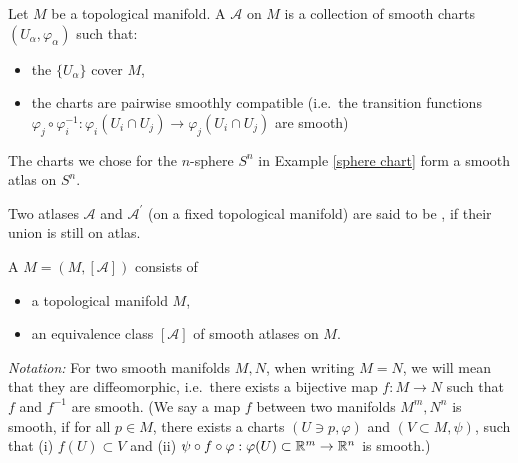 \documentclass[a4paper,11pt]{article}
\begin{document}

\begin{definition}
    Let \(M\) be a topological manifold. A  \(\mathcal{A}\) on \(M\) is a collection of smooth charts \((U_\alpha,\varphi_\alpha)\) such that:
    \begin{itemize}
        \item the \(\{U_\alpha\}\) cover \(M\),
        \item the charts are pairwise smoothly compatible (i.e.\ the transition functions \(\varphi_j \circ \varphi_i^{-1}:\varphi_i(U_i\cap U_j)\to\varphi_j(U_i\cap U_j)\) are smooth)
    \end{itemize}
\end{definition}

\begin{example}
    The charts we chose for the \(n\)-sphere \(S^n\) in Example \ref{sphere chart} form a smooth atlas on \(S^n\).
\end{example}

\begin{definition}
    Two atlases \(\mathcal{A}\) and \(\mathcal{A}^\prime\) (on a fixed topological manifold) are said to be , if their union is still on atlas.
\end{definition}


\begin{definition}
    A  \(M=(M,[\mathcal{A}])\) consists of
    \begin{itemize}
        \item a topological manifold \(M\),
        \item an equivalence class \([\mathcal{A}]\) of smooth atlases on \(M\).
    \end{itemize}
\end{definition}

\noindent\textit{Notation:}
    For two smooth manifolds \(M,N\), when writing \(M=N\), we will mean that they are diffeomorphic, i.e.\ there exists a bijective map \(f:M\to N\) such that \(f\) and \(f^{-1}\) are smooth. 
    (We say a map \(f\) between two manifolds \(M^m,N^n\) is smooth, if for all \(p\in M\), there exists a charts \((U\ni p,\varphi)\) and \((V\subset M,\psi)\), such that 
    (i) \(f(U)\subset V\) and 
    (ii) \(\psi\circ f\circ \varphi:\varphi(U)\subset \mathbb{R}^m\to\mathbb{R}^n\) is smooth.)
\end{document}
